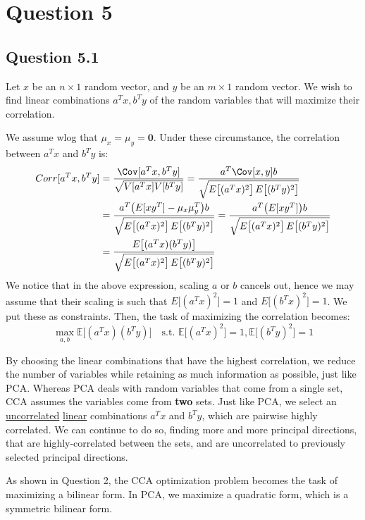 \documentclass{article}
\begin{document}
\section*{Question 5}
\subsection*{Question 5.1}
Let $x$ be an $n \times 1$ random vector, and $y$ be an $m \times 1$ random vector.  We wish to find linear combinations $a^{T}x, b^{T}y$ of the random variables that will maximize their correlation. 

We assume wlog that $\mu_{x} = \mu_{y} = \bm{0}$. Under these circumstance, the correlation between $a^{T}x$ and $b^{T}y$ is:
\begin{align*}
  Corr[a^{T}x, b^{T}y] &= \frac{\Cov[a^{T}x, b^{T}y]}{\sqrt{ V[a^{T}x] V[b^{T}y]}}  = \frac{a^{T} \Cov[x,y] b}{\sqrt{ E\big[(a^{T}x)^2 \big] \, E \big[(b^{T}y)^2 \big] }} \\
  &=  \frac{a^{T} \big( E[xy^{T}] - \mu_{x} \mu_{y}^{T} \big) b}{\sqrt{ E\big[(a^{T}x)^2 \big] \, E \big[(b^{T}y)^2 \big] }} =  \frac{a^{T} \big( E[xy^{T}] \big) b}{\sqrt{ E\big[(a^{T}x)^2 \big] \, E \big[(b^{T}y)^2 \big] }} \\
  &=  \frac{ E \big[(a^{T}x)(b^{T}y)  \big] }{\sqrt{ E\big[(a^{T}x)^2 \big] \, E \big[(b^{T}y)^2 \big] }}
\end{align*}
We notice that in the above expression, scaling $a$ or $b$ cancels out, hence we may assume that their scaling is such that $E \big[ (a^{T}x) ^2 \big] = 1$ and $E \big[ (b^{T}x) ^2  \big] = 1$. We put these as constraints. Then, the task of maximizing the correlation becomes:
\[
  \max_{a,b} \mathbb{E} \Big[ (a^{T}x)(b^{T}y) \Big] \quad \text{s.t. } \mathbb{E} \big[(a^{T}x)^2 \big] =1, \mathbb{E} \big[(b^{T}y)^2  \big] = 1
\]

By choosing the linear combinations that have the highest correlation, we reduce the number of variables while retaining as much information as possible, just like PCA. 
Whereas PCA deals with random variables that come from a single set, CCA assumes the variables come from \textbf{two} sets. Just like PCA, we select an \ul{uncorrelated} \ul{linear} combinations $a^{T}x$ and $b^{T}y$, which are pairwise highly correlated. We can continue to do so, finding more and more principal directions, that are highly-correlated between the sets, and are uncorrelated to previously selected principal directions. 

As shown in Question 2, the CCA optimization problem becomes the task of maximizing a bilinear form. In PCA, we maximize a quadratic form, which is a symmetric bilinear form. 
\end{document}
